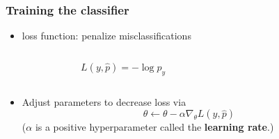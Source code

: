 \documentclass{beamer}
\begin{document}
    \begin{frame}
        \frametitle{Training the classifier}

        \begin{itemize}
            \setlength\itemsep{1em}
            \item loss function: penalize misclassifications
            \begin{columns}
                \begin{column}{0.5\textwidth}
            \[
                L(y, \widehat{p}) = -\log \widehat{p}_y
            \]
                \end{column}
                \begin{column}{0.5\textwidth}
                    \bigskip

                \pgfplotsset{width=2in}
            \end{column}
        \end{columns}
        \item Adjust parameters to decrease loss via
        \[
            \theta \leftarrow \theta - \alpha \nabla_\theta L(y,\widehat{p})
        \]
        ($\alpha$ is a positive hyperparameter called the \textbf{learning rate}.)
        \end{itemize}
    \end{frame}
\end{document}
